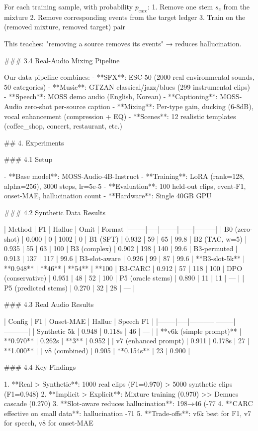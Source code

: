 For each training sample, with probability $p_{\text{carc}}$:
1. Remove one stem $s_e$ from the mixture
2. Remove corresponding events from the target ledger
3. Train on the (removed mixture, removed target) pair

This teaches: "removing a source removes its events" → reduces hallucination.

### 3.4 Real-Audio Mixing Pipeline

Our data pipeline combines:
- **SFX**: ESC-50 (2000 real environmental sounds, 50 categories)
- **Music**: GTZAN classical/jazz/blues (299 instrumental clips)
- **Speech**: MOSS demo audio (English, Korean)
- **Captioning**: MOSS-Audio zero-shot per-source caption
- **Mixing**: Per-type gain, ducking (6-8dB), vocal enhancement (compression + EQ)
- **Scenes**: 12 realistic templates (coffee_shop, concert, restaurant, etc.)

## 4. Experiments

### 4.1 Setup

- **Base model**: MOSS-Audio-4B-Instruct
- **Training**: LoRA (rank=128, alpha=256), 3000 steps, lr=5e-5
- **Evaluation**: 100 held-out clips, event-F1, onset-MAE, hallucination count
- **Hardware**: Single 40GB GPU

### 4.2 Synthetic Data Results

| Method | F1 | Halluc | Omit | Format%
|--------|-----|--------|------|---------|
| B0 (zero-shot) | 0.000 | 0 | 1002 | 0%
| B1 (SFT) | 0.932 | 59 | 65 | 99.8%
| B2 (TAC, w=5) | 0.935 | 55 | 63 | 100%
| B3 (complex) | 0.902 | 198 | 140 | 99.6%
| B3-permuted | 0.913 | 137 | 117 | 99.6%
| B3-slot-aware | 0.926 | 99 | 87 | 99.6%
| **B3-slot-5k** | **0.948** | **46** | **54** | **100%
| B3-CARC | 0.912 | 57 | 118 | 100%
| DPO (conservative) | 0.951 | 48 | 52 | 100%
| P5 (oracle stems) | 0.890 | 11 | 11 | — |
| P5 (predicted stems) | 0.270 | 32 | 28 | — |

### 4.3 Real Audio Results

| Config | F1 | Onset-MAE | Halluc | Speech F1 |
|--------|-----|-----------|--------|-----------|
| Synthetic 5k | 0.948 | 0.118s | 46 | — |
| **v6k (simple prompt)** | **0.970** | 0.262s | **3** | 0.952 |
| v7 (enhanced prompt) | 0.911 | 0.178s | 27 | **1.000** |
| v8 (combined) | 0.905 | **0.154s** | 23 | 0.900 |

### 4.4 Key Findings

1. **Real > Synthetic**: 1000 real clips (F1=0.970) > 5000 synthetic clips (F1=0.948)
2. **Implicit > Explicit**: Mixture training (0.970) >> Demucs cascade (0.270)
3. **Slot-aware reduces hallucination**: 198→46 (-77%
4. **CARC effective on small data**: hallucination -71%
5. **Trade-offs**: v6k best for F1, v7 for speech, v8 for onset-MAE

